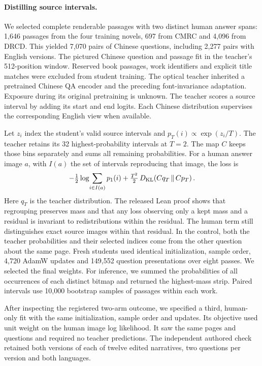 \paragraph{Distilling source intervals.}
We selected complete renderable passages with two distinct human answer spans: 1,646 passages from the four training novels, 697 from CMRC and 4,096 from DRCD. This yielded 7,070 pairs of Chinese questions, including 2,277 pairs with English versions. The pictured Chinese question and passage fit in the teacher's 512-position window. Reserved book passages, work identifiers and explicit title matches were excluded from student training. The optical teacher inherited a pretrained Chinese QA encoder and the preceding font-invariance adaptation. Exposure during its original pretraining is unknown. The teacher scores a source interval by adding its start and end logits. Each Chinese distribution supervises the corresponding English view when available.

Let $z_i$ index the student's valid source intervals and $p_T(i)\propto\exp(z_i/T)$. The teacher retains its 32 highest-probability intervals at $T=2$. The map $C$ keeps those bins separately and sums all remaining probabilities. For a human answer image $a$, with $I(a)$ the set of intervals reproducing that image, the loss is
\[
  -\tfrac12\log\!\sum_{i\in I(a)}p_1(i)
  +\tfrac{T^2}{2}\,D_{\rm KL}\!\left(Cq_T\,\Vert\,Cp_T\right).
\]
Here $q_T$ is the teacher distribution. The released Lean proof shows that regrouping preserves mass and that any loss observing only a kept mass and a residual is invariant to redistributions within the residual. The human term still distinguishes exact source images within that residual. In the control, both the teacher probabilities and their selected indices come from the other question about the same page. Fresh students used identical initialization, sample order, 4,720 AdamW updates and 149,552 question presentations over eight passes. We selected the final weights. For inference, we summed the probabilities of all occurrences of each distinct bitmap and returned the highest-mass strip. Paired intervals use 10,000 bootstrap samples of passages within each work.

After inspecting the registered two-arm outcome, we specified a third, human-only fit with the same initialization, sample order and updates. Its objective used unit weight on the human image log likelihood. It saw the same pages and questions and required no teacher predictions. The independent authored check retained both versions of each of twelve edited narratives, two questions per version and both languages.
